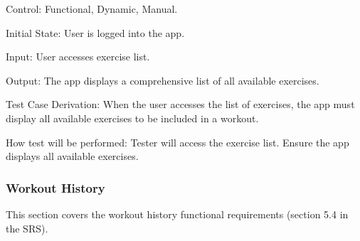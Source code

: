 \documentclass[12pt, titlepage]{article}
\begin{document}
\begin{enumerate}
        Control: Functional, Dynamic, Manual.

        Initial State: User is logged into the app.

        Input: User accesses exercise list.

        Output: The app displays a comprehensive list of all available exercises.

        Test Case Derivation: When the user accesses the list of exercises, the app must display all available exercises to be included in a workout.

        How test will be performed: Tester will access the exercise list. Ensure the app displays all available exercises.

    \end{enumerate}

    \subsubsection{Workout History}
    This section covers the workout history functional requirements (section 5.4 in the SRS).
\end{document}
